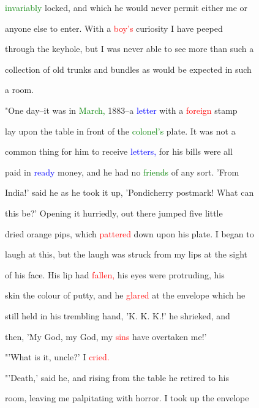  \textcolor{green}{invariably} locked, and which he would never permit either me or

 anyone else to enter. With a \textcolor{red}{boy's} \textcolor{BurntOrange}{curiosity} I have peeped

 through the keyhole, but I was never able to see more than such a

 collection of old trunks and bundles as would be \textcolor{BurntOrange}{expected} in such

 a room.



 "One day--it was in \textcolor{green}{March,} 1883--a \textcolor{blue}{letter} with a \textcolor{red}{foreign} stamp

 lay upon the table in front of the \textcolor{green}{colonel's} plate. It was not a

 common thing for him to receive \textcolor{blue}{letters,} for his bills were all

 paid in \textcolor{blue}{ready} \textcolor{BurntOrange}{money,} and he had no \textcolor{green}{friends} of any sort. 'From

 India!' said he as he took it up, 'Pondicherry postmark! What can

 this be?' Opening it hurriedly, out there jumped five little

 dried orange pips, which \textcolor{red}{pattered} down upon his plate. I began to

 \textcolor{BurntOrange}{laugh} at this, but the \textcolor{BurntOrange}{laugh} was struck from my lips at the sight

 of his face. His lip had \textcolor{red}{fallen,} his eyes were protruding, his

 skin the colour of putty, and he \textcolor{red}{glared} at the envelope which he

 still held in his trembling hand, 'K. K. K.!' he \textcolor{BurntOrange}{shrieked,} and

 then, 'My \textcolor{BurntOrange}{God,} my \textcolor{BurntOrange}{God,} my \textcolor{red}{sins} have overtaken me!'



 "'What is it, uncle?' I \textcolor{red}{cried.}



 \textcolor{BurntOrange}{"'Death,'} said he, and rising from the table he retired to his

 room, \textcolor{BurntOrange}{leaving} me palpitating with \textcolor{BurntOrange}{horror.} I took up the envelope

